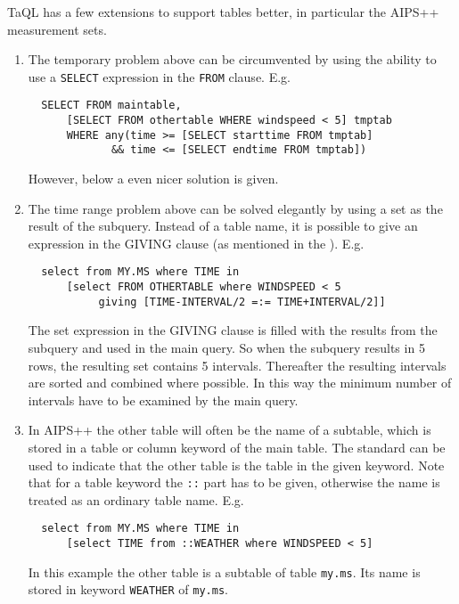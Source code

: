 TaQL has a few extensions to support tables better,
in particular the AIPS++ measurement sets.
\begin{enumerate}
\item
The temporary problem above can be circumvented by using the
ability to use a \texttt{SELECT} expression in the \texttt{FROM}
clause. E.g.
\begin{verbatim}
  SELECT FROM maintable,
      [SELECT FROM othertable WHERE windspeed < 5] tmptab
      WHERE any(time >= [SELECT starttime FROM tmptab]
             && time <= [SELECT endtime FROM tmptab])
\end{verbatim}
However, below a even nicer solution is given. 

\item
The time range problem above can be solved elegantly by using
a set as the result of the subquery. Instead of a table name,
it is possible to give an expression in the GIVING clause (as mentioned
in the ). E.g.
\begin{verbatim}
  select from MY.MS where TIME in
      [select FROM OTHERTABLE where WINDSPEED < 5
           giving [TIME-INTERVAL/2 =:= TIME+INTERVAL/2]]
\end{verbatim}
The set expression in the GIVING clause is filled with the
results from the subquery and used in the main query. So when
the subquery results in 5 rows, the resulting set contains 5
intervals. Thereafter the resulting intervals are sorted and combined
where possible. In this way the minimum number of intervals have to be
examined by the main query.

\item
In AIPS++ the other table will often be the name of a subtable,
which is stored in a table or column keyword of the main table.
The standard  can be used
to indicate that the other table is the table in the given keyword.
Note that for a table keyword the \texttt{::} part has to be given,
otherwise the name is treated as an ordinary table name. E.g.
\begin{verbatim}
  select from MY.MS where TIME in
      [select TIME from ::WEATHER where WINDSPEED < 5]
\end{verbatim}
In this example the other table is a subtable of table \texttt{my.ms}.
Its name is stored in keyword \texttt{WEATHER} of \texttt{my.ms}.


\end{enumerate}

